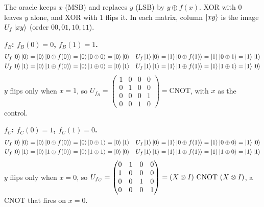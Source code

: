 \documentclass[a4paper, 10pt]{article}
\begin{document}
\begin{solution}
	\noindent The oracle keeps \( x \) (MSB) and replaces \( y \) (LSB) by \( y \oplus f(x) \). XOR with \( 0 \) leaves \( y \) alone, and XOR with \( 1 \) flips it.
	In each matrix, column \( \ket{xy} \) is the image \( U_f\ket{xy} \) (order \( 00, 01, 10, 11 \)).

	\noindent \textbf{\( f_B \): \( f_B(0) = 0 \), \( f_B(1) = 1 \).}
	\begin{align*}
		U_f\ket{0}\ket{0} & = \ket{0}\ket{0 \oplus f(0)} = \ket{0}\ket{0 \oplus 0} = \ket{0}\ket{0} &
		U_f\ket{1}\ket{0} & = \ket{1}\ket{0 \oplus f(1)} = \ket{1}\ket{0 \oplus 1} = \ket{1}\ket{1}   \\
		U_f\ket{0}\ket{1} & = \ket{0}\ket{1 \oplus f(0)} = \ket{0}\ket{1 \oplus 0} = \ket{0}\ket{1} &
		U_f\ket{1}\ket{1} & = \ket{1}\ket{1 \oplus f(1)} = \ket{1}\ket{1 \oplus 1} = \ket{1}\ket{0}
	\end{align*}
	\( y \) flips only when \( x = 1 \), so \( U_{f_B} = \begin{pmatrix} 1 & 0 & 0 & 0 \\ 0 & 1 & 0 & 0 \\ 0 & 0 & 0 & 1 \\ 0 & 0 & 1 & 0 \end{pmatrix} = \mathrm{CNOT} \), with \( x \) as the control.

	\noindent \textbf{\( f_C \): \( f_C(0) = 1 \), \( f_C(1) = 0 \).}
	\begin{align*}
		U_f\ket{0}\ket{0} & = \ket{0}\ket{0 \oplus f(0)} = \ket{0}\ket{0 \oplus 1} = \ket{0}\ket{1} &
		U_f\ket{1}\ket{0} & = \ket{1}\ket{0 \oplus f(1)} = \ket{1}\ket{0 \oplus 0} = \ket{1}\ket{0}   \\
		U_f\ket{0}\ket{1} & = \ket{0}\ket{1 \oplus f(0)} = \ket{0}\ket{1 \oplus 1} = \ket{0}\ket{0} &
		U_f\ket{1}\ket{1} & = \ket{1}\ket{1 \oplus f(1)} = \ket{1}\ket{1 \oplus 0} = \ket{1}\ket{1}
	\end{align*}
	\( y \) flips only when \( x = 0 \), so \( U_{f_C} = \begin{pmatrix} 0 & 1 & 0 & 0 \\ 1 & 0 & 0 & 0 \\ 0 & 0 & 1 & 0 \\ 0 & 0 & 0 & 1 \end{pmatrix} = \left(X \otimes I\right)\,\mathrm{CNOT}\,\left(X \otimes I\right) \), a CNOT that fires on \( x = 0 \).


\end{solution}
\end{document}
